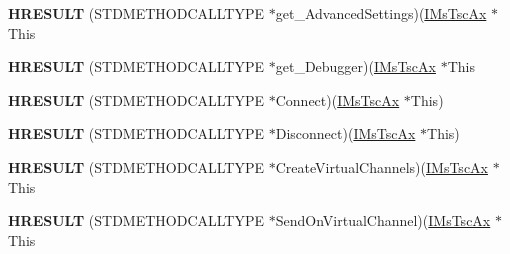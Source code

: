 \begin{DoxyCompactItemize}
\item 
\mbox{\label{struct_m_s_t_s_c_lib_1_1_i_ms_tsc_ax_vtbl_a5f43551918d49fbd398ce9935df7e88c}} 
{\bfseries H\+R\+E\+S\+U\+LT} (S\+T\+D\+M\+E\+T\+H\+O\+D\+C\+A\+L\+L\+T\+Y\+PE $\ast$get\+\_\+\+Advanced\+Settings)(\hyperlink{interface_m_s_t_s_c_lib_1_1_i_ms_tsc_ax}{I\+Ms\+Tsc\+Ax} $\ast$This
\item 
\mbox{\label{struct_m_s_t_s_c_lib_1_1_i_ms_tsc_ax_vtbl_a972139c0719c5e93b39e81e8ddcba670}} 
{\bfseries H\+R\+E\+S\+U\+LT} (S\+T\+D\+M\+E\+T\+H\+O\+D\+C\+A\+L\+L\+T\+Y\+PE $\ast$get\+\_\+\+Debugger)(\hyperlink{interface_m_s_t_s_c_lib_1_1_i_ms_tsc_ax}{I\+Ms\+Tsc\+Ax} $\ast$This
\item 
\mbox{\label{struct_m_s_t_s_c_lib_1_1_i_ms_tsc_ax_vtbl_a81b5ca7725fea613780a5a1f4bd560e5}} 
{\bfseries H\+R\+E\+S\+U\+LT} (S\+T\+D\+M\+E\+T\+H\+O\+D\+C\+A\+L\+L\+T\+Y\+PE $\ast$Connect)(\hyperlink{interface_m_s_t_s_c_lib_1_1_i_ms_tsc_ax}{I\+Ms\+Tsc\+Ax} $\ast$This)
\item 
\mbox{\label{struct_m_s_t_s_c_lib_1_1_i_ms_tsc_ax_vtbl_a4c59842ae6a2bcda66ead3e8cc4a5072}} 
{\bfseries H\+R\+E\+S\+U\+LT} (S\+T\+D\+M\+E\+T\+H\+O\+D\+C\+A\+L\+L\+T\+Y\+PE $\ast$Disconnect)(\hyperlink{interface_m_s_t_s_c_lib_1_1_i_ms_tsc_ax}{I\+Ms\+Tsc\+Ax} $\ast$This)
\item 
\mbox{\label{struct_m_s_t_s_c_lib_1_1_i_ms_tsc_ax_vtbl_a8f33fbc59e66481efbf32f61c22fa990}} 
{\bfseries H\+R\+E\+S\+U\+LT} (S\+T\+D\+M\+E\+T\+H\+O\+D\+C\+A\+L\+L\+T\+Y\+PE $\ast$Create\+Virtual\+Channels)(\hyperlink{interface_m_s_t_s_c_lib_1_1_i_ms_tsc_ax}{I\+Ms\+Tsc\+Ax} $\ast$This
\item 
\mbox{\label{struct_m_s_t_s_c_lib_1_1_i_ms_tsc_ax_vtbl_aa77292764c6527867e1a0ed6af9d4030}} 
{\bfseries H\+R\+E\+S\+U\+LT} (S\+T\+D\+M\+E\+T\+H\+O\+D\+C\+A\+L\+L\+T\+Y\+PE $\ast$Send\+On\+Virtual\+Channel)(\hyperlink{interface_m_s_t_s_c_lib_1_1_i_ms_tsc_ax}{I\+Ms\+Tsc\+Ax} $\ast$This
\end{DoxyCompactItemize}
